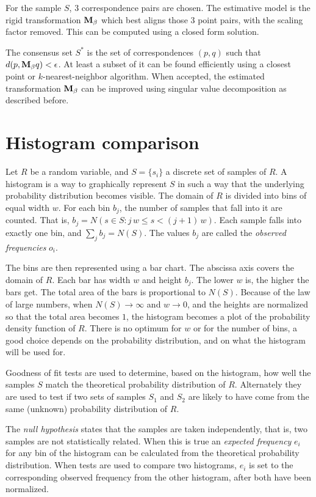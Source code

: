 For the sample $S$, $3$ correspondence pairs are chosen. The estimative model is the rigid transformation $\mathbf{M}_{\beta}$ which best aligns those $3$ point pairs, with the scaling factor removed. This can be computed using a closed form solution.

The consensus set $S^{*}$ is the set of correspondences $(p, q)$ such that $d(p, \mathbf{M}_{\beta} q) < \epsilon$. At least a subset of it can be found efficiently using a closest point or $k$-nearest-neighbor algorithm. When accepted, the estimated transformation $\mathbf{M}_{\beta}$ can be improved using singular value decomposition as described before.


\section{Histogram comparison} \label{sec:histogram_comp}
Let $R$ be a random variable, and $S = \{ s_i \}$ a discrete set of samples of $R$. A histogram is a way to graphically represent $S$ in such a way that the underlying probability distribution becomes visible. The domain of $R$ is divided into bins of equal width $w$. For each bin $b_j$, the number of samples that fall into it are counted. That is, $b_j = N(s \in S : j\,w \leq s < (j + 1)\,w)$. Each sample falls into exactly one bin, and $\sum_j b_j = N(S)$. The values $b_j$ are called the \emph{observed frequencies} $o_i$.

The bins are then represented using a bar chart. The abscissa axis covers the domain of $R$. Each bar has width $w$ and height $b_j$. The lower $w$ is, the higher the bars get. The total area of the bars is proportional to $N(S)$. Because of the law of large numbers, when $N(S) \rightarrow \infty$ and $w \rightarrow 0$, and the heights are normalized so that the total area becomes $1$, the histogram becomes a plot of the probability density function of $R$. There is no optimum for $w$ or for the number of bins, a good choice depends on the probability distribution, and on what the histogram will be used for. 

Goodness of fit tests are used to determine, based on the histogram, how well the samples $S$ match the theoretical probability distribution of $R$. Alternately they are used to test if two sets of samples $S_1$ and $S_2$ are likely to have come from the same (unknown) probability distribution of $R$.

The \emph{null hypothesis} states that the samples are taken independently, that is, two samples are not statistically related. When this is true an \emph{expected frequency} $e_i$ for any bin of the histogram can be calculated from the theoretical probability distribution. When tests are used to compare two histograms, $e_i$ is set to the corresponding observed frequency from the other histogram, after both have been normalized.

